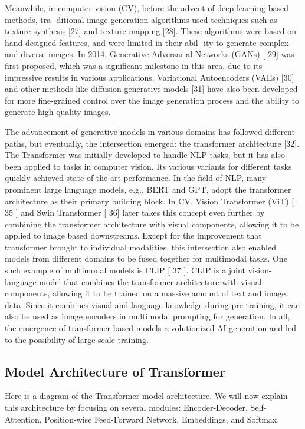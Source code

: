 \documentclass[conference]{IEEEtran}
\begin{document}
\par Meanwhile, in computer vision (CV), before the advent of deep learning-based methods, tra-
ditional image generation algorithms used techniques such as texture synthesis [27] and texture
mapping [28]. These algorithms were based on hand-designed features, and were limited in their abil-
ity to generate complex and diverse images. In 2014, Generative Adversarial Networks (GANs) [ 29]
was first proposed, which was a significant milestone in this area, due to its impressive results
in various applications. Variational Autoencoders (VAEs) [30] and other methods like diffusion
generative models [31] have also been developed for more fine-grained control over the image
generation process and the ability to generate high-quality images.
\par The advancement of generative models in various domains has followed different paths, but
eventually, the intersection emerged: the transformer architecture [32]. The Transformer was 
initially developed to handle NLP tasks, but it has also been applied to tasks in computer vision. 
Its various variants for different tasks quickly achieved state-of-the-art performance. In the field of NLP, many
prominent large language models, e.g., BERT and GPT, adopt the transformer architecture as
their primary building block. In CV, Vision Transformer (ViT) [ 35 ] and Swin Transformer [ 36] 
later takes this concept even further by combining the transformer architecture with visual components, 
allowing it to be applied to image based downstreams. 
Except for the improvement that transformer brought
to individual modalities, this intersection also enabled models from different domains to be fused
together for multimodal tasks. One such example of multimodal models is CLIP [ 37 ]. CLIP is a
joint vision-language model that combines the transformer architecture with visual components,
allowing it to be trained on a massive amount of text and image data. Since it combines visual
and language knowledge during pre-training, it can also be used as image encoders in multimodal
prompting for generation. In all, the emergence of transformer based models revolutionized AI
generation and led to the possibility of large-scale training.

\subsection{Model Architecture of Transformer}
\par Here is a diagram of the Transformer model architecture. 
We will now explain this architecture by focusing on several modules: 
Encoder-Decoder, Self-Attention, Position-wise Feed-Forward Network, 
Embeddings, and Softmax.
\end{document}
